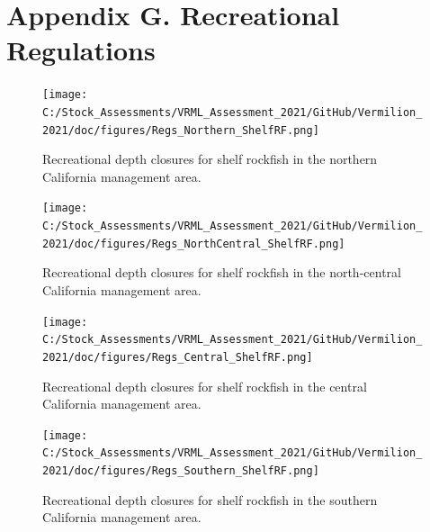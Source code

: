 \documentclass[11pt,
  english,
]{article}
\begin{document}
\clearpage


\hypertarget{appendix-g.-recreational-regulations}{%
\section*{Appendix G. Recreational Regulations}\label{appendix-g.-recreational-regulations}}

\leavevmode\tagmcend\tagstructend

\renewcommand{\thepage}{G\arabic{page}}
\renewcommand{\thefigure}{G\arabic{figure}}
\renewcommand{\thetable}{G\arabic{table}}
\setcounter{page}{1}
\setcounter{figure}{0}
\setcounter{table}{0}

\clearpage

\begin{landscape}


\begin{figure}
\texttt{[image: C:/Stock\_Assessments/VRML\_Assessment\_2021/GitHub/Vermilion\_2021/doc/figures/Regs\_Northern\_ShelfRF.png]}
\caption{Recreational depth closures for shelf rockfish in the northern California management area.\label{fig:rec-reg-n}}
\end{figure}

\FloatBarrier

\begin{figure}
\texttt{[image: C:/Stock\_Assessments/VRML\_Assessment\_2021/GitHub/Vermilion\_2021/doc/figures/Regs\_NorthCentral\_ShelfRF.png]}
\caption{Recreational depth closures for shelf rockfish in the north-central California management area.\label{fig:rec-reg-cn}}
\end{figure}

\FloatBarrier

\begin{figure}
\texttt{[image: C:/Stock\_Assessments/VRML\_Assessment\_2021/GitHub/Vermilion\_2021/doc/figures/Regs\_Central\_ShelfRF.png]}
\caption{Recreational depth closures for shelf rockfish in the central California management area.\label{fig:rec-reg-cs}}
\end{figure}


\begin{figure}
\texttt{[image: C:/Stock\_Assessments/VRML\_Assessment\_2021/GitHub/Vermilion\_2021/doc/figures/Regs\_Southern\_ShelfRF.png]}
\caption{Recreational depth closures for shelf rockfish in the southern California management area.\label{fig:rec-reg-s}}
\end{figure}


\end{landscape}
\end{document}
